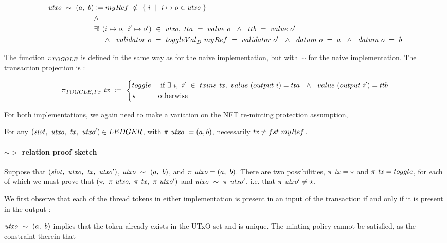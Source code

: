 \begin{align*}
  \var{utxo}~\sim~(a,~b) &\leteq \mathsf{myRef}~\notin~\{ ~i~\mid~i\mapsto o \in  \var{utxo}~\} \\
  & \wedge \\
  & \exists ! ~(i\mapsto o,~i'\mapsto o')~\in~\var{utxo},~\fun{tta}~=~\val~o~~\wedge~~\fun{ttb}~=~\val~o'\\
  & ~~~~ \wedge~~\validator~o~=~\toggleVal_D~\mathsf{myRef}~=~\validator~o'~~
  \wedge~~\datum~o~=~a~~\wedge~~\datum~o~=~b
\end{align*}

The function $\pi_{\TOGGLE}$ is defined in the same way as for the naive
implementation, but with $\sim$ for the naive implementation. The transaction
projection is :

\begin{align*}
  \pi_{\TOGGLE,\Tx}~\var{tx}~ \leteq~\begin{cases}
    \toggle & \text{ if } \exists~i,~i'~ \in~\inputs~\var{tx},~\val~(\fun{output}~i) = \fun{tta} ~~\wedge ~~\val~(\fun{output}~i') = \fun{ttb}\\
    \emptytype & \text{otherwise}
  \end{cases}
\end{align*}

For both implementations, we again need to make a variation on the NFT
re-minting protection assumption,

For any $(\var{slot},~\var{utxo},~\var{tx},~\var{utxo'}) \in \LEDGER$, with
$\pi~\mathit{utxo}~= (a, b)$, necessarily $\var{tx} \neq \fun{fst}~\mathsf{myRef}$.

\paragraph{$\sim >$ relation proof sketch }

Suppose that $(\mathit{slot},~\mathit{utxo},~\mathit{tx},~\mathit{utxo'})$, $\mathit{utxo}~\sim~(a,~b)$,
and $\pi~\mathit{utxo} = (a,~b)$. There are two possibilities, $\pi~\mathit{tx} = \star$
and $\pi~\var{tx} = \toggle$, for each of which we must prove that
$(\star,~\pi~\mathit{utxo},~\pi~\mathit{tx},~\pi~\mathit{utxo'})$ and $\mathit{utxo}~\sim~\pi~\mathit{utxo'}$,
i.e. that $\pi~\mathit{utxo'} \neq \star$.

We first observe that each of the thread tokens in either implementation
is present in an input of the transaction if and only
if it is present in the output :

$\mathit{utxo}~\sim~(a,~b)$ implies that the token already exists in the UTxO set and is unique.
The minting policy cannot be satisfied, as the constraint therein that


